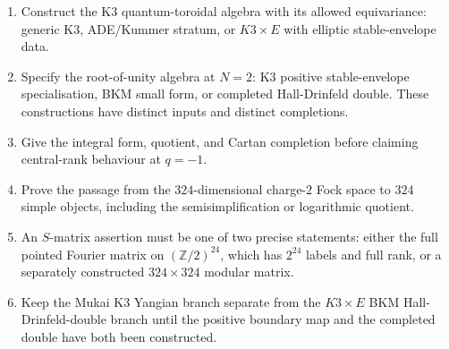\begin{enumerate}[label=\textup{(\arabic*)}]
\item Construct the K3 quantum-toroidal algebra with its allowed
equivariance: generic K3, ADE/Kummer stratum, or \(K3\times E\) with
elliptic stable-envelope data.
\item Specify the root-of-unity algebra at \(N=2\): K3 positive
stable-envelope specialisation, BKM small form, or completed
Hall-Drinfeld double.  These constructions have distinct inputs and
distinct completions.
\item Give the integral form, quotient, and Cartan completion before
claiming central-rank behaviour at \(q=-1\).
\item Prove the passage from the \(324\)-dimensional charge-\(2\) Fock
space to \(324\) simple objects, including the semisimplification or
logarithmic quotient.
\item An \(S\)-matrix assertion must be one of two precise statements:
either the full pointed Fourier matrix on
\((\mathbb Z/2)^{24}\), which has \(2^{24}\) labels and full rank, or a
separately constructed \(324\times324\) modular matrix.
\item Keep the Mukai K3 Yangian branch separate from the
\(K3\times E\) BKM Hall-Drinfeld-double branch until the positive
boundary map and the completed double have both been constructed.
\end{enumerate}
